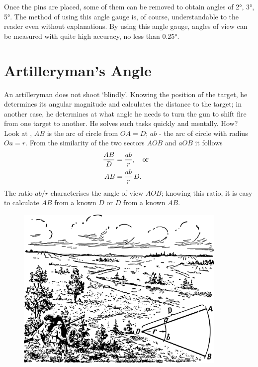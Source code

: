 Once the pins are placed, some of them can be removed to obtain angles of \ang{2}, \ang{3}, \ang{5}. The method of using this angle gauge is, of course, understandable to the reader even without explanations. By using this angle gauge, angles of view can be measured with quite high accuracy, no less than \ang{0.25}.

\section{Artilleryman's Angle}
\label{sec-3.10}

An artilleryman does not shoot `blindly'. Knowing the position of the target, he determines its angular magnitude and calculates the distance to the target; in another case, he determines at what angle he needs to turn the gun to shift fire from one target to another. He solves such tasks quickly and mentally. How? Look at , $AB$ is the arc of circle from $OA = D$; $ab$ - the arc of circle with radius $Oa = r$. From the similarity of the two sectors $AOB$ and $aOB$ it follows
\begin{align*}%
\frac{AB}{D} & = \frac{ab}{r}, \qor \\ 
AB & = \frac{ab}{r}\, D.
\end{align*}
The ratio $ab/r$ characterises the angle of view $AOB$; knowing this ratio, it is easy to calculate $AB$ from a known $D$ or $D$ from a known $AB$.

\begin{figure}[h!]
\centering
\includegraphics[width=0.9\textwidth]{figures/ch-03/fig-072.pdf}
\end{figure}


